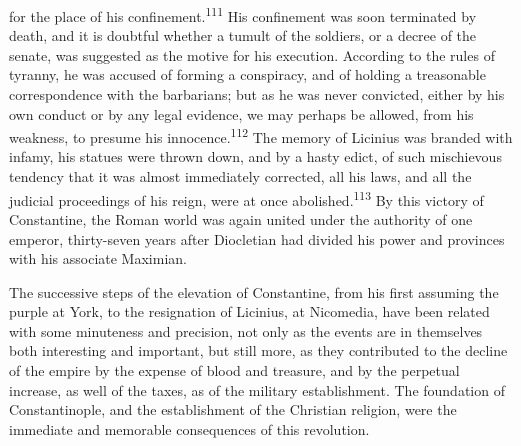for the place of his confinement.\textsuperscript{111} His confinement was soon
terminated by death, and it is doubtful whether a tumult of the
soldiers, or a decree of the senate, was suggested as the motive
for his execution. According to the rules of tyranny, he was
accused of forming a conspiracy, and of holding a treasonable
correspondence with the barbarians; but as he was never
convicted, either by his own conduct or by any legal evidence, we
may perhaps be allowed, from his weakness, to presume his
innocence.\textsuperscript{112} The memory of Licinius was branded with infamy,
his statues were thrown down, and by a hasty edict, of such
mischievous tendency that it was almost immediately corrected,
all his laws, and all the judicial proceedings of his reign, were
at once abolished.\textsuperscript{113} By this victory of Constantine, the Roman
world was again united under the authority of one emperor,
thirty-seven years after Diocletian had divided his power and
provinces with his associate Maximian.





The successive steps of the elevation of Constantine, from his
first assuming the purple at York, to the resignation of
Licinius, at Nicomedia, have been related with some minuteness
and precision, not only as the events are in themselves both
interesting and important, but still more, as they contributed to
the decline of the empire by the expense of blood and treasure,
and by the perpetual increase, as well of the taxes, as of the
military establishment. The foundation of Constantinople, and the
establishment of the Christian religion, were the immediate and
memorable consequences of this revolution.

